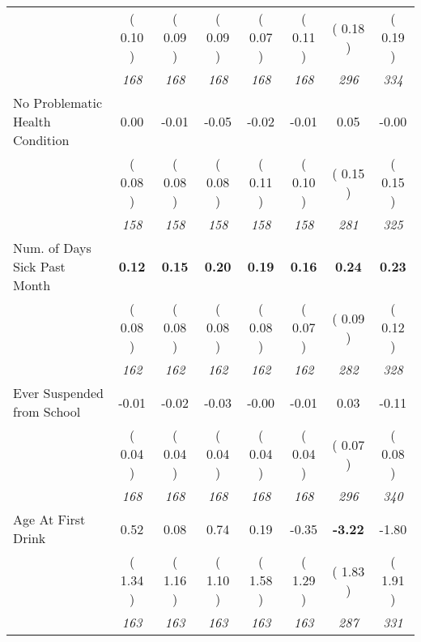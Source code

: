 \begin{tabular}{l c c c c c c c}
& (     0.10 ) & (     0.09 ) & (     0.09 ) & (     0.07 ) & (     0.11 ) & (     0.18 ) & (     0.19 ) \\
& \textit{ 168 } & \textit{ 168 } & \textit{ 168 } & \textit{ 168 } & \textit{ 168 } & \textit{ 296 } & \textit{ 334 } \\
No Problematic Health Condition &      0.00 &     -0.01 &     -0.05 &     -0.02 &     -0.01 &      0.05 &     -0.00 \\
& (     0.08 ) & (     0.08 ) & (     0.08 ) & (     0.11 ) & (     0.10 ) & (     0.15 ) & (     0.15 ) \\
& \textit{ 158 } & \textit{ 158 } & \textit{ 158 } & \textit{ 158 } & \textit{ 158 } & \textit{ 281 } & \textit{ 325 } \\
Num. of Days Sick Past Month & \textbf{      0.12 } & \textbf{      0.15 } & \textbf{      0.20 } & \textbf{     0.19} & \textbf{     0.16} & \textbf{      0.24 } & \textbf{      0.23 } \\
& (     0.08 ) & (     0.08 ) & (     0.08 ) & (     0.08 ) & (     0.07 ) & (     0.09 ) & (     0.12 ) \\
& \textit{ 162 } & \textit{ 162 } & \textit{ 162 } & \textit{ 162 } & \textit{ 162 } & \textit{ 282 } & \textit{ 328 } \\
Ever Suspended from School &     -0.01 &     -0.02 &     -0.03 &     -0.00 &     -0.01 &      0.03 &     -0.11 \\
& (     0.04 ) & (     0.04 ) & (     0.04 ) & (     0.04 ) & (     0.04 ) & (     0.07 ) & (     0.08 ) \\
& \textit{ 168 } & \textit{ 168 } & \textit{ 168 } & \textit{ 168 } & \textit{ 168 } & \textit{ 296 } & \textit{ 340 } \\
Age At First Drink &      0.52 &      0.08 &      0.74 &      0.19 &     -0.35 & \textbf{     -3.22 } &     -1.80 \\
& (     1.34 ) & (     1.16 ) & (     1.10 ) & (     1.58 ) & (     1.29 ) & (     1.83 ) & (     1.91 ) \\
& \textit{ 163 } & \textit{ 163 } & \textit{ 163 } & \textit{ 163 } & \textit{ 163 } & \textit{ 287 } & \textit{ 331 } \\
\bottomrule
\end{tabular}
